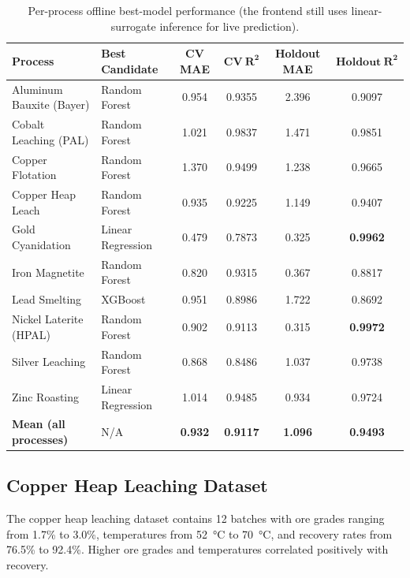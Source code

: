 \documentclass[12pt,a4paper]{report}
\begin{document}
\begin{table}[H]
\centering
\caption{Per-process offline best-model performance (the frontend still uses linear-surrogate inference for live prediction).}
\label{tab:model_results}
\footnotesize
\begin{tabular}{@{} l l c c c c @{}}
\toprule
\textbf{Process} & \textbf{Best Candidate} & \textbf{CV MAE} & $\boldsymbol{CV\ R^2}$ & \textbf{Holdout MAE} & $\boldsymbol{Holdout\ R^2}$ \\
\midrule
Aluminum Bauxite (Bayer)  & Random Forest    & 0.954 & 0.9355 & 2.396 & 0.9097 \\
Cobalt Leaching (PAL)     & Random Forest    & 1.021 & 0.9837 & 1.471 & 0.9851 \\
Copper Flotation          & Random Forest    & 1.370 & 0.9499 & 1.238 & 0.9665 \\
Copper Heap Leach         & Random Forest    & 0.935 & 0.9225 & 1.149 & 0.9407 \\
Gold Cyanidation          & Linear Regression & 0.479 & 0.7873 & 0.325 & \textbf{0.9962} \\
Iron Magnetite            & Random Forest    & 0.820 & 0.9315 & 0.367 & 0.8817 \\
Lead Smelting             & XGBoost          & 0.951 & 0.8986 & 1.722 & 0.8692 \\
Nickel Laterite (HPAL)    & Random Forest    & 0.902 & 0.9113 & 0.315 & \textbf{0.9972} \\
Silver Leaching           & Random Forest    & 0.868 & 0.8486 & 1.037 & 0.9738 \\
Zinc Roasting             & Linear Regression & 1.014 & 0.9485 & 0.934 & 0.9724 \\
\midrule
\textbf{Mean (all processes)} & N/A & \textbf{0.932} & \textbf{0.9117} & \textbf{1.096} & \textbf{0.9493} \\
\bottomrule
\end{tabular}
\end{table}

\subsection{Copper Heap Leaching Dataset}

The copper heap leaching dataset contains 12 batches with ore grades ranging from 1.7\% to 3.0\%, temperatures from \SI{52}{\degreeCelsius} to \SI{70}{\degreeCelsius}, and recovery rates from 76.5\% to 92.4\%. Higher ore grades and temperatures correlated positively with recovery.
\end{document}
